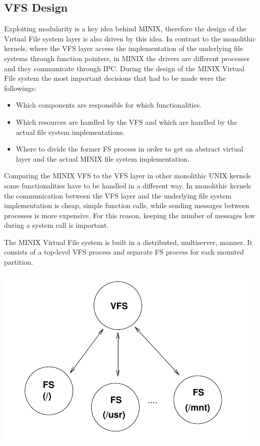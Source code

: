 \subsection{VFS Design }
Exploiting modularity is a key idea behind MINIX, therefore the design of the Virtual File system layer is also driven by this idea. In contrast to the monolithic kernels, where the VFS layer access the implementation of the underlying file systems through function pointers, in MINIX the drivers are different processes and they communicate through IPC. During the design of the MINIX Virtual File system the most important decisions that had to be made were the followings:
\begin{itemize}
\item Which components are responsible for which functionalities.

\item Which resources are handled by the VFS and which are handled by the actual file system implementations.

\item  Where to divide the former FS process in order to get an abstract virtual layer and the actual MINIX file system implementation.
\end{itemize}

Comparing the MINIX VFS to the VFS layer in other monolithic UNIX kernels some functionalities have to be handled in a different way. In monolithic kernels the communication between the VFS layer and the underlying file system implementation is cheap, simple function calls, while sending messages between processes is more expensive. For this reason, keeping the number of messages low during a system call is important.

The MINIX Virtual File system is built in a distributed, multiserver, manner. It consists of a top-level VFS process and separate FS process for each mounted partition.

\includegraphics[scale=0.7]{./pics/vfsfs.png}

